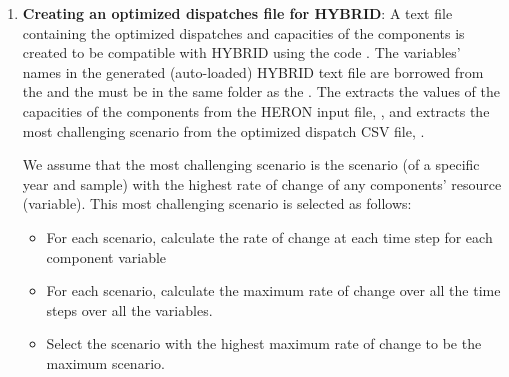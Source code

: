 \begin{enumerate}
This step creates  that the HYBRID user should modify or review before moving to the next step. The  includes a list of the HERON variables and their corresponding HYBRID variables (that the HYBRID user may change) plus the location of . The  is a file that includes all the HYBRID variables. All the capacities and dispatches should be a subset of this file's variables. This file helps to ensure that the HYBRID capacities and dispatches are identified by HYBRID. Currently the  is {"dsfinal.txt"} which is located in
\begin{lstlisting}
/HERON/tests/integration_tests/mechanics/
optimizedDispatch2Hybrid/dsfinal.txt
\end{lstlisting}
The user can change the file location in the .



\item \textbf{Creating an optimized dispatches file for HYBRID}: A text file containing the optimized dispatches and capacities of the components is created to be compatible with HYBRID using the code . The variables' names in the generated (auto-loaded) HYBRID text file are borrowed from the  and the  must be in the same folder as the .
 The  extracts the values of the capacities of the components from the HERON input file, , and extracts the most challenging scenario from the optimized dispatch CSV file, .

 We assume that the most challenging scenario is the scenario (of a specific year and sample) with the highest rate of change of any components' resource (variable). This most challenging scenario is selected as follows:


\begin{itemize}
 \item For each scenario, calculate the rate of change at each time step for each component variable
  \item For each scenario, calculate the maximum rate of change over all the time steps over all the variables.
   \item Select the scenario with the highest maximum rate of change to be the maximum scenario.
 \end{itemize}




\end{enumerate}
